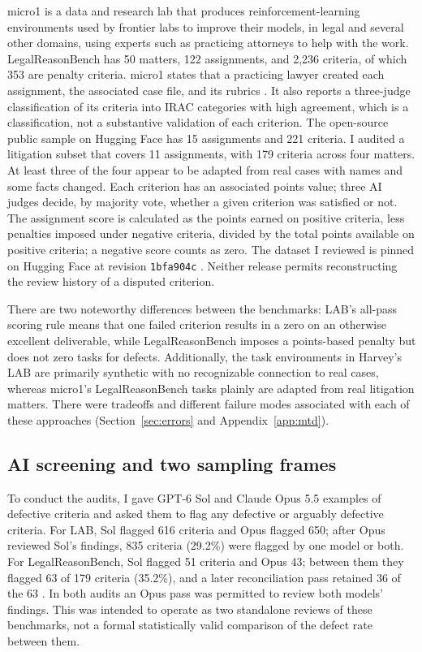 \documentclass[11pt]{article}
\newcommand{\labSolFlagged}{616}
\newcommand{\labOpusBlind}{650}
\newcommand{\labFlagged}{835}
\newcommand{\labFlaggedPct}{29.2}
\newcommand{\lrbAssignments}{11}
\newcommand{\lrbCriteria}{179}
\newcommand{\lrbFlagged}{63}
\newcommand{\lrbSolFlagged}{51}
\newcommand{\lrbOpusFlagged}{43}
\newcommand{\lrbReconciled}{36}
\newcommand{\lrbFlaggedPct}{35.2}
\begin{document}
micro1 is a data and research lab that produces reinforcement-learning environments used by frontier labs to improve their models, in legal and several other domains, using experts such as practicing attorneys to help with the work. LegalReasonBench has 50 matters, 122 assignments, and 2,236 criteria, of which 353 are penalty criteria. micro1 states that a practicing lawyer created each assignment, the associated case file, and its rubrics \citep{micro1LRB}. It also reports a three-judge classification of its criteria into IRAC categories with high agreement, which is a classification, not a substantive validation of each criterion. The open-source public sample on Hugging Face has 15 assignments and 221 criteria. I audited a litigation subset that covers \lrbAssignments{} assignments, with \lrbCriteria{} criteria across four matters. At least three of the four appear to be adapted from real cases with names and some facts changed. Each criterion has an associated points value; three AI judges decide, by majority vote, whether a given criterion was satisfied or not. The assignment score is calculated as the points earned on positive criteria, less penalties imposed under negative criteria, divided by the total points available on positive criteria; a negative score counts as zero. The dataset I reviewed is pinned on Hugging Face at revision \texttt{1bfa904c} \citep{lrbaudit}. Neither release permits reconstructing the review history of a disputed criterion.

There are two noteworthy differences between the benchmarks: LAB's all-pass scoring rule means that one failed criterion results in a zero on an otherwise excellent deliverable, while LegalReasonBench imposes a points-based penalty but does not zero tasks for defects. Additionally, the task environments in Harvey's LAB are primarily synthetic with no recognizable connection to real cases, whereas micro1's LegalReasonBench tasks plainly are adapted from real litigation matters. There were tradeoffs and different failure modes associated with each of these approaches (Section~\ref{sec:errors} and Appendix~\ref{app:mtd}).

\subsection{AI screening and two sampling frames}

To conduct the audits, I gave GPT-6 Sol and Claude Opus 5.5 examples of defective criteria and asked them to flag any defective or arguably defective criteria. For LAB, Sol flagged \labSolFlagged{} criteria and Opus flagged \labOpusBlind{}; after Opus reviewed Sol's findings, \labFlagged{} criteria (\labFlaggedPct\%) were flagged by one model or both. For LegalReasonBench, Sol flagged \lrbSolFlagged{} criteria and Opus \lrbOpusFlagged{}; between them they flagged \lrbFlagged{} of \lrbCriteria{} criteria (\lrbFlaggedPct\%), and a later reconciliation pass retained \lrbReconciled{} of the \lrbFlagged{} \citep{lrbaudit}. In both audits an Opus pass was permitted to review both models' findings. This was intended to operate as two standalone reviews of these benchmarks, not a formal statistically valid comparison of the defect rate between them.
\end{document}
